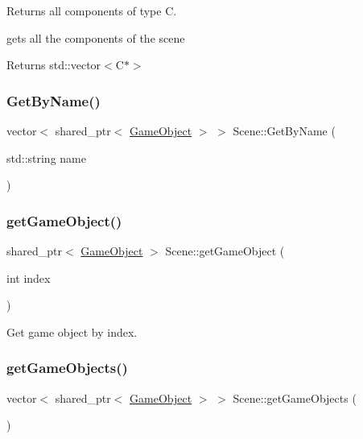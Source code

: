 Returns all components of type C. 

gets all the components of the scene

\begin{DoxyReturn}{Returns}
std\+::vector$<$\+C$\ast$$>$ 
\end{DoxyReturn}
\hypertarget{class_mason_1_1_scene_a684a224fe56794d0db86da99947a6fac}{}\label{class_mason_1_1_scene_a684a224fe56794d0db86da99947a6fac} 
\subsubsection{\texorpdfstring{Get\+By\+Name()}{GetByName()}}
{\footnotesize\ttfamily vector$<$ shared\+\_\+ptr$<$ \hyperlink{class_mason_1_1_game_object}{Game\+Object} $>$ $>$ Scene\+::\+Get\+By\+Name (\begin{DoxyParamCaption}\item[{std\+::string}]{name }\end{DoxyParamCaption})\hspace{0.3cm}{\ttfamily [static]}}

\hypertarget{class_mason_1_1_scene_ae13738888d4f00135fb827639f87239b}{}\label{class_mason_1_1_scene_ae13738888d4f00135fb827639f87239b} 
\subsubsection{\texorpdfstring{get\+Game\+Object()}{getGameObject()}}
{\footnotesize\ttfamily shared\+\_\+ptr$<$ \hyperlink{class_mason_1_1_game_object}{Game\+Object} $>$ Scene\+::get\+Game\+Object (\begin{DoxyParamCaption}\item[{int}]{index }\end{DoxyParamCaption})}



Get game object by index. 

\hypertarget{class_mason_1_1_scene_a045d786fa6f11ab01e190971637b15ce}{}\label{class_mason_1_1_scene_a045d786fa6f11ab01e190971637b15ce} 
\subsubsection{\texorpdfstring{get\+Game\+Objects()}{getGameObjects()}}
{\footnotesize\ttfamily vector$<$ shared\+\_\+ptr$<$ \hyperlink{class_mason_1_1_game_object}{Game\+Object} $>$ $>$ Scene\+::get\+Game\+Objects (\begin{DoxyParamCaption}{ }\end{DoxyParamCaption})}



